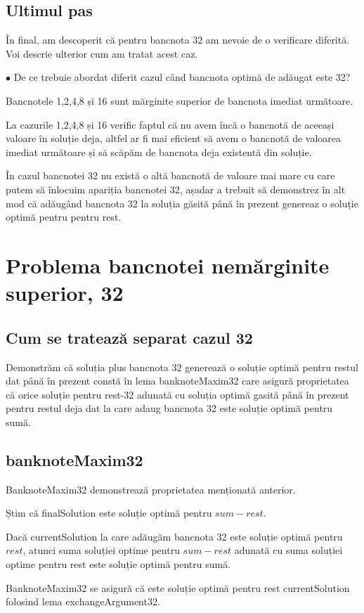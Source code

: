     \subsection{Ultimul pas}
    În final, am descoperit că pentru bancnota 32 am nevoie de o verificare diferită. Voi descrie ulterior cum am tratat acest caz.\par
    $\bullet$ De ce trebuie abordat diferit cazul când bancnota optimă de adăugat este 32?\par
    Bancnotele 1,2,4,8 și 16 sunt mărginite superior de bancnota imediat următoare.\par
    La cazurile 1,2,4,8 și 16 verific  faptul că nu avem încă o bancnotă de aceeași valoare în soluție deja, 
    altfel ar fi mai eficient să avem o bancnotă de valoarea imediat următoare și să scăpăm de bancnota deja 
    existentă din soluție.\par
    În cazul bancnotei 32 nu există o altă bancnotă de valoare mai mare cu care putem să înlocuim apariția bancnotei 32,
    așadar a trebuit să demonstrez în alt mod că adăugând bancnota 32 la soluția găsită până în prezent genereaz o soluție optimă pentru 
    pentru rest.   
    
    
    
    
\section{Problema bancnotei nemărginite superior, 32}

\subsection{Cum se tratează separat cazul 32}
Demonstrăm că soluția plus bancnota 32 generează o soluție optimă pentru restul dat până în prezent 
constă în lema banknoteMaxim32 care asigură proprietatea că orice soluție pentru rest-32 adunată cu soluția optimă 
gasită până în prezent pentru restul deja dat la care adaug bancnota 32 este soluție optimă pentru sumă.

\subsection{banknoteMaxim32}
BanknoteMaxim32 demonstrează proprietatea menționată anterior.\par
Știm că finalSolution este soluție optimă pentru $sum-rest$.\par
Dacă currentSolution la care adăugăm bancnota 32 este soluție optimă pentru $rest$, atunci suma soluției optime 
pentru $sum-rest$ adunată cu suma soluției optime pentru rest este soluție optimă pentru sumă.  \par
BanknoteMaxim32 se asigură că este soluție optimă pentru rest currentSolution folosind lema exchangeArgument32.

